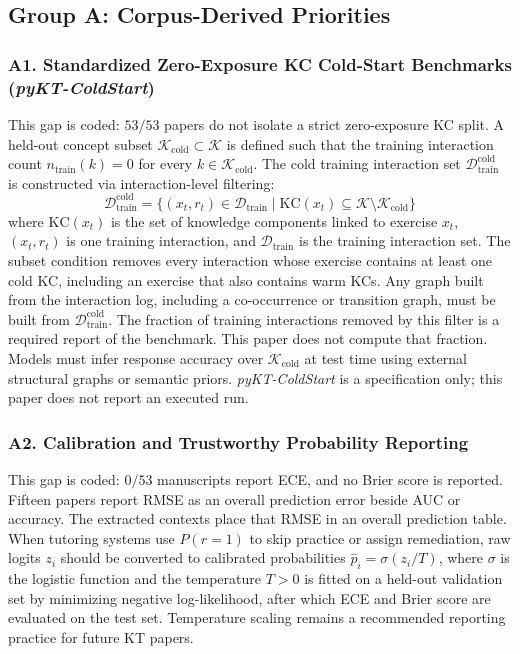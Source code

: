 \documentclass[lettersize,journal]{IEEEtran}
\begin{document}
\subsection{Group A: Corpus-Derived Priorities}

\subsubsection{A1. Standardized Zero-Exposure KC Cold-Start Benchmarks (\emph{pyKT-ColdStart})}
This gap is coded: $53/53$ papers do not isolate a strict zero-exposure KC split. A held-out concept subset $\mathcal{K}_{\text{cold}} \subset \mathcal{K}$ is defined such that the training interaction count $n_{\text{train}}(k) = 0$ for every $k \in \mathcal{K}_{\text{cold}}$. The cold training interaction set $\mathcal{D}_{\text{train}}^{\text{cold}}$ is constructed via interaction-level filtering:
\begin{equation}
\mathcal{D}_{\text{train}}^{\text{cold}} = \{(x_t, r_t) \in \mathcal{D}_{\text{train}} \mid \text{KC}(x_t) \subseteq \mathcal{K} \setminus \mathcal{K}_{\mathrm{cold}}\}
\end{equation}
where $\text{KC}(x_t)$ is the set of knowledge components linked to exercise $x_t$, $(x_t, r_t)$ is one training interaction, and $\mathcal{D}_{\text{train}}$ is the training interaction set. The subset condition removes every interaction whose exercise contains at least one cold KC, including an exercise that also contains warm KCs. Any graph built from the interaction log, including a co-occurrence or transition graph, must be built from $\mathcal{D}_{\text{train}}^{\text{cold}}$. The fraction of training interactions removed by this filter is a required report of the benchmark. This paper does not compute that fraction. Models must infer response accuracy over $\mathcal{K}_{\text{cold}}$ at test time using external structural graphs or semantic priors. \emph{pyKT-ColdStart} is a specification only; this paper does not report an executed run.

\subsubsection{A2. Calibration and Trustworthy Probability Reporting}
This gap is coded: $0/53$ manuscripts report ECE, and no Brier score is reported. Fifteen papers report RMSE as an overall prediction error beside AUC or accuracy. The extracted contexts place that RMSE in an overall prediction table. When tutoring systems use $P(r=1)$ to skip practice or assign remediation, raw logits $z_i$ should be converted to calibrated probabilities $\hat{p}_i = \sigma(z_i/T)$, where $\sigma$ is the logistic function and the temperature $T>0$ is fitted on a held-out validation set by minimizing negative log-likelihood, after which ECE and Brier score are evaluated on the test set. Temperature scaling remains a recommended reporting practice for future KT papers.
\end{document}
